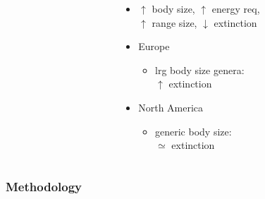 \documentclass{beamer} \usepackage{amsmath,amsthm}
\begin{document}
\begin{frame}
\begin{columns}
\begin{column}{0.5\textwidth}
      \tiny{}
    \end{column}
    \begin{column}{0.5\textwidth}
      \begin{itemize}
        \item \(\uparrow\) body size, \(\uparrow\) energy req, \\\(\uparrow\) range size, \(\downarrow\) extinction
        \item Europe
          \begin{itemize}
            \item lrg body size genera: \\\(\uparrow\) extinction
          \end{itemize}
        \item North America
          \begin{itemize}
            \item generic body size: \\\(\simeq\) extinction
          \end{itemize}
      \end{itemize}
    \end{column}
  \end{columns}
\end{frame}

\begin{frame}
  \frametitle{Methodology}
\end{frame}
\end{document}
